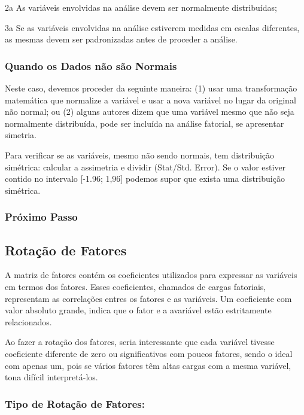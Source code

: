         2a As variáveis envolvidas na análise devem ser normalmente distribuídas;
        
        3a Se as variáveis envolvidas na análise estiverem medidas em escalas diferentes, as mesmas devem ser padronizadas antes de proceder a análise.
        
        \subsubsection{Quando os Dados não são Normais}
    
            Neste caso, devemos proceder da seguinte maneira: (1) usar uma transformação matemática que normalize a variável e usar a nova variável no lugar da original não normal; ou (2) alguns autores dizem que uma variável mesmo que não seja normalmente distribuída, pode ser incluída na análise fatorial, se apresentar simetria.
        
            Para verificar se as variáveis, mesmo não sendo normais, tem distribuição simétrica: calcular a assimetria e dividir (Stat/Std. Error). Se o valor estiver contido no intervalo [-1.96; 1,96] podemos supor que exista uma distribuição simétrica.
        
    \subsubsection{Próximo Passo}
        
    \subsection{Rotação de Fatores}
        
        A matriz de fatores contém os coeficientes utilizados para expressar as variáveis em termos dos fatores. Esses coeficientes, chamados de cargas fatoriais, representam as correlações entres os fatores e as variáveis. Um coeficiente com valor absoluto grande, indica que o fator e a avariável estão estritamente relacionados.
            
        Ao fazer a rotação dos fatores, seria interessante que cada variável tivesse coeficiente diferente de zero ou significativos com poucos fatores, sendo o ideal com apenas um, pois se vários fatores têm altas cargas com a mesma variável, tona difícil interpretá-los.
            
        \subsubsection{Tipo de Rotação de Fatores:}
            
